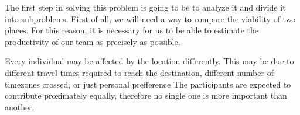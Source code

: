 
The first step in solving this problem is going to be to analyze it and divide it into subproblems. First of all, we will need a way to compare the viability of two places. For this reason, it is necessary for us to be able to estimate the productivity of our team as precisely as possible.

Every individual may be affected by the location differently. This may be due to different travel times required to reach the destination, different number of timezones crossed, or just personal prefference
The participants are expected to contribute proximately equally, therefore no single one is more important than another.
